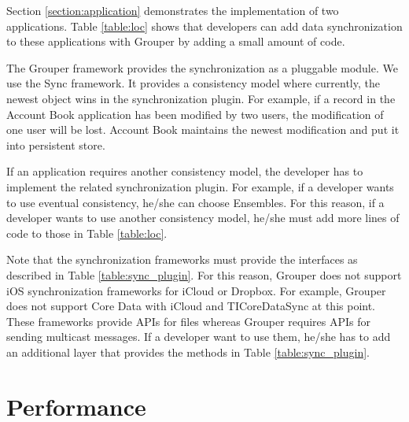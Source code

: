 \documentclass[a4paper,11pt]{report}
\begin{document}
Section \ref{section:application} demonstrates the implementation of two applications.
Table \ref{table:loc} shows that developers can add data synchronization to these applications with Grouper by adding a small amount of code. 

The Grouper framework provides the synchronization as a pluggable module.
We use the Sync\cite{sync} framework.
It provides a consistency model where currently, the newest object wins in the synchronization plugin.
For example, if a record in the Account Book application has been modified by two users, the modification of one user will be lost.
Account Book maintains the newest modification and put it into persistent store.

If an application requires another consistency model, the developer has to implement the related synchronization plugin.
For example, if a developer wants to use eventual consistency, he/she can choose Ensembles\cite{ensembles}.
For this reason, if a developer wants to use another consistency model, he/she must add more lines of code to those in Table \ref{table:loc}.

Note that the synchronization frameworks must provide the interfaces as described in Table \ref{table:sync_plugin}.
For this reason, Grouper does not support iOS synchronization frameworks for iCloud or Dropbox.
For example, Grouper does not support Core Data with iCloud\cite{coredata} and TICoreDataSync\cite{ticoredatasyn} at this point.
These frameworks provide APIs for files whereas Grouper requires APIs for sending multicast messages.
If a developer want to use them, he/she has to add an additional layer that provides the methods in Table \ref{table:sync_plugin}.

\section{Performance} \label{section:performance}
\end{document}
